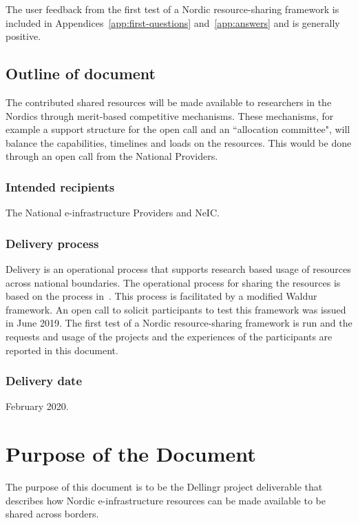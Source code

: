 \documentclass{article}
\newcommand{\dell}{Dellingr\xspace}
\newcommand{\einfra}{e-infrastructure\xspace}
\newcommand{\pilot}{first test of a Nordic resource-sharing framework\xspace}
\begin{document}
The user feedback from the \pilot is included in Appendices~\ref{app:first-questions} and~\ref{app:answers} and is generally positive.

\subsection{Outline of document}

The contributed shared resources will be made available to researchers in the Nordics through merit-based competitive mechanisms. These mechanisms, for example a support structure for the open call and an ``allocation committee", will balance the capabilities, timelines and loads on the resources. This would be done through an open call from the National Providers.

\subsubsection{Intended recipients}

The National \einfra Providers and NeIC. 

\subsubsection{Delivery process}

Delivery is an operational process that supports research based usage of resources across national boundaries. 
The operational process for sharing the resources is based on the process in~\cite{dellingr-p2-do5}.
This process is facilitated by a modified Waldur~\cite{waldur} framework.
An open call to solicit participants to test this framework was issued in June 2019.
The \pilot is run and the requests and usage of the projects and the experiences of the participants are reported in this document.
\subsubsection{Delivery date}

February 2020.

\section{Purpose of the Document}

The purpose of this document is to be the \dell project deliverable that describes how Nordic \einfra resources
can be made available to be shared across borders.
\end{document}

